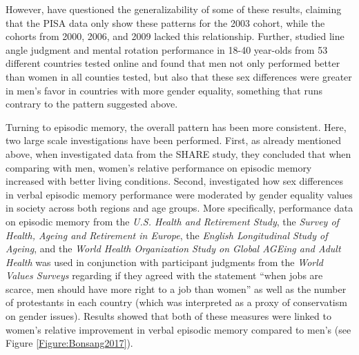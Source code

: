 However, \textcite{Stoet2013,Stoet2015} have questioned the generalizability of some of these results, claiming that the PISA data only show these patterns for the 2003 cohort, while the cohorts from 2000, 2006, and 2009 lacked this relationship. Further, \textcite{Lippa2010c} studied line angle judgment and mental rotation performance in 18-40 year-olds from 53 different countries tested online and found that men not only performed better than women in all counties tested, but also that these sex differences were greater in men's favor in countries with more gender equality, something that runs contrary to the pattern suggested above.

Turning to episodic memory, the overall pattern has been more consistent. Here, two large scale investigations have been performed. First, as already mentioned above, when \textcite{Weber2014} investigated data from the SHARE study, they concluded that when comparing with men, women's relative performance on episodic memory increased with better living conditions. Second, \textcite{Bonsang2017} investigated how sex differences in verbal episodic memory performance were moderated by gender equality values in society across both regions and age groups. More specifically, performance data on episodic memory from the \emph{U.S. Health and Retirement Study}, the \emph{Survey of Health, Ageing and Retirement in Europe}, the \emph{English Longitudinal Study of Ageing}, and the \emph{World Health Organization Study on Global AGEing and Adult Health} was used in conjunction with participant judgments from the \emph{World Values Surveys} regarding if they agreed with the statement ``when jobs are scarce, men should have more right to a job than women'' as well as the number of protestants in each country (which was interpreted as a proxy of conservatism on gender issues). Results showed that both of these measures were linked to women's relative improvement in verbal episodic memory compared to men's (see Figure \ref{Figure:Bonsang2017}).

